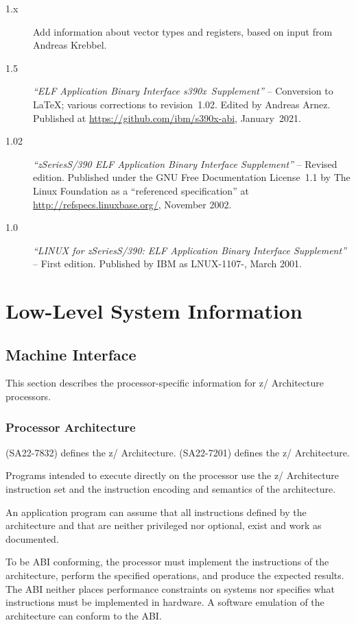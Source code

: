 \documentclass[english,11pt,twoside,toc=bib,toc=idx]{scrreprt}
\newcommand{\ABINAME}{s390x}
\newcommand{\ARCH}{z/\kern-1pt Ar\-chi\-tec\-ture}
\newcommand{\ARCHarch}{\ARCH}
\newcommand{\theARCH}{the \ARCH}
\newcommand{\ABINAME}{s390}
\newcommand{\ARCH}{ESA/390}
\newcommand{\ARCHarch}{the \ARCH{} ar\-chi\-tec\-ture}
\newcommand{\theARCH}{\ARCHarch}
\begin{document}
\begin{description}
\item[1.x] Add information about vector types and registers, based on
  input from Andreas Krebbel.
\item[1.5] \emph{``ELF Application Binary Interface
    \ABINAME{}~Supplement''} -- Conversion to \LaTeX{}; various
  corrections to revision~1.02.  Edited by Andreas Arnez.  Published at
  \url{https://github.com/ibm/s390x-abi}, January~2021.
\item[1.02] \emph{``{\ifzseries zSeries\else S/390\fi} ELF Application
    Binary Interface Supplement''} -- Revised edition.  Published under
  the GNU Free Documentation License~1.1 by The Linux Foundation as a
  ``referenced specification'' at \url{http://refspecs.linuxbase.org/},
  November 2002.
\item[1.0] \emph{``LINUX for {\ifzseries zSeries\else S/390\fi}: ELF
    Application Binary Interface Supplement''} -- First edition.
  Published by IBM as LNUX-1107-{\fi}, March 2001.
\end{description}

\chapter{Low-Level System Information}
\section{Machine Interface}
This section describes the processor-specific information for
\ARCH{} processors.

\subsection{Processor Architecture}
{\ifzseries
  \cite{sa22} (SA22-7832) defines \theARCH{}.
  \else
  \cite{sa22} (SA22-7201) defines \theARCH{}.
  \fi}

Programs intended to execute directly on the processor use the
\ARCH{} instruction set and the
instruction encoding and semantics of the architecture.

An application program can assume that all instructions defined by the
architecture and that are neither privileged nor optional, exist and work
as documented.

To be ABI conforming, the processor must implement the instructions of
the architecture, perform the specified operations, and produce the
expected results.  The ABI neither places performance constraints on
systems nor specifies what instructions must be implemented in
hardware.  A software emulation of the architecture can conform to
the ABI\@.
\end{document}
